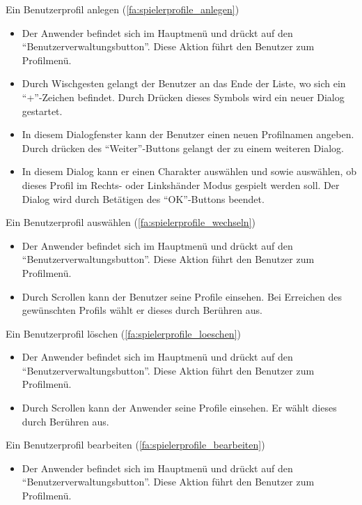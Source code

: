 \documentclass{scrartcl}
\begin{document}
\begin{telist}
	\item Ein Benutzerprofil anlegen (\ref{fa:spielerprofile_anlegen})
	\begin{itemize}
		\item Der Anwender befindet sich im Hauptmenü und drückt auf den \enquote{Benutzerverwaltungsbutton}. Diese Aktion führt den Benutzer zum Profilmenü.
		\item Durch Wischgesten gelangt der Benutzer an das Ende der Liste, wo sich ein \enquote{+}-Zeichen befindet. Durch Drücken dieses Symbols wird ein neuer Dialog gestartet.
		\item In diesem Dialogfenster kann der Benutzer einen neuen Profilnamen angeben. Durch drücken des \enquote{Weiter}-Buttons gelangt der zu einem weiteren Dialog.
		\item In diesem Dialog kann er einen Charakter auswählen und sowie auswählen, ob dieses Profil im Rechts- oder Linkshänder Modus gespielt werden soll. Der Dialog wird durch Betätigen des \enquote{OK}-Buttons beendet.
	\end{itemize}
	\item Ein Benutzerprofil auswählen (\ref{fa:spielerprofile_wechseln})
	\begin{itemize}
		\item Der Anwender befindet sich im Hauptmenü und drückt auf den \enquote{Benutzerverwaltungsbutton}. Diese Aktion führt den Benutzer zum Profilmenü.
		\item Durch Scrollen kann der Benutzer seine Profile einsehen. Bei Erreichen des gewünschten Profils wählt er dieses durch Berühren aus.
	\end{itemize}
	\item Ein Benutzerprofil löschen (\ref{fa:spielerprofile_loeschen})
	\begin{itemize}
		\item Der Anwender befindet sich im Hauptmenü und drückt auf den \enquote{Benutzerverwaltungsbutton}. Diese Aktion führt den Benutzer zum Profilmenü.
		\item Durch Scrollen kann der Anwender seine Profile einsehen. Er wählt dieses durch Berühren aus. 
	\end{itemize}
	\item Ein Benutzerprofil bearbeiten (\ref{fa:spielerprofile_bearbeiten})
	\begin{itemize}
		\item Der Anwender befindet sich im Hauptmenü und drückt auf den \enquote{Benutzerverwaltungsbutton}. Diese Aktion führt den Benutzer zum Profilmenü.

\end{itemize}
\end{telist}
\end{document}
